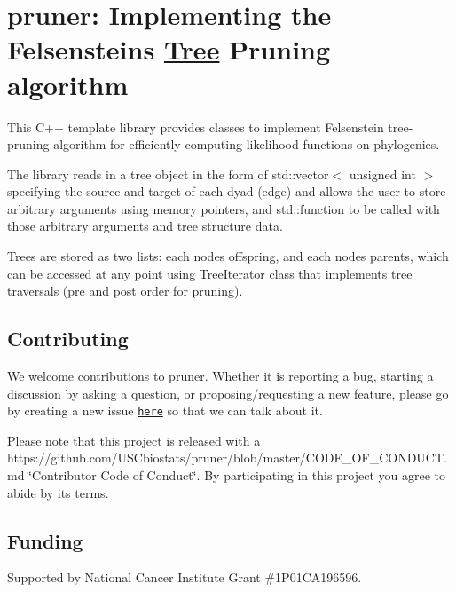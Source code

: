 \href{https://travis-ci.org/USCbiostats/pruner}{\tt }

\section*{pruner\+: Implementing the Felsenstein\textquotesingle{}s \hyperlink{classTree}{Tree} Pruning algorithm}

This C++ template library provides classes to implement Felsenstein tree-\/pruning algorithm for efficiently computing likelihood functions on phylogenies.

The library reads in a tree object in the form of {\ttfamily std\+::vector$<$ unsigned int $>$} specifying the source and target of each dyad (edge) and allows the user to store arbitrary arguments using memory pointers, and {\ttfamily std\+::function} to be called with those arbitrary arguments and tree structure data.

Trees are stored as two lists\+: each nodes\textquotesingle{} offspring, and each nodes\textquotesingle{} parents, which can be accessed at any point using {\ttfamily \hyperlink{classTreeIterator}{Tree\+Iterator}} class that implements tree traversals (pre and post order for pruning).

\subsection*{Contributing}

We welcome contributions to {\ttfamily pruner}. Whether it is reporting a bug, starting a discussion by asking a question, or proposing/requesting a new feature, please go by creating a new issue \href{https://github.com/USCbiostats/pruner/issues}{\tt here} so that we can talk about it.

Please note that this project is released with a https\+://github.com/\+U\+S\+Cbiostats/pruner/blob/master/\+C\+O\+D\+E\+\_\+\+O\+F\+\_\+\+C\+O\+N\+D\+U\+C\+T.\+md \char`\"{}\+Contributor Code of Conduct\char`\"{}. By participating in this project you agree to abide by its terms.

\subsection*{Funding}

Supported by National Cancer Institute Grant \#1\+P01\+C\+A196596. 
